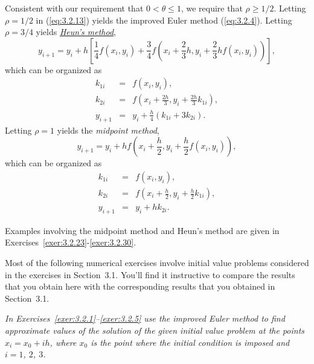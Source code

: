 Consistent with our requirement that $0<\theta\le1$, we require that $\rho\ge1/2$. Letting $\rho=1/2$
in (\ref{eq:3.2.13}) yields the improved Euler method (\ref{eq:3.2.4}). Letting $\rho=3/4$ yields
\href{https://mathshistory.st-andrews.ac.uk/Biographies/Heun/}{\color{blue}
\it Heun's method},
\[
  y_{i+1}=y_{i}+h\left[\frac{1}{4}f(x_{i},y_{i})+\frac{3}{4}f\left( x_{i}+\frac{2}{3}h,y_{i}+\frac{2}{3}hf(x_{i},y_{i})\right)\right],
\]
which can be organized as
\begin{eqnarray*}
  k_{1i}  & = & f(x_{i},y_{i}),                                            \\
  k_{2i}  & = & f\left(x_{i}+\frac{2h}{3},y_{i}+\frac{2h}{3}k_{1i}\right), \\
  y_{i+1} & = & y_{i}+\frac{h}{4}(k_{1i}+3k_{2i}).
\end{eqnarray*}
Letting $\rho=1$ yields the {\color{blue}\it midpoint method\/},
\[
  y_{i+1}=y_{i}+hf\left(x_{i}+\frac{h}{2},y_{i}+\frac{h}{2}f(x_{i},y_{i})\right),
\]
which can be organized as
\begin{eqnarray*}
  k_{1i}  & = & f(x_{i},y_{i}),                                          \\
  k_{2i}  & = & f\left(x_{i}+\frac{h}{2},y_{i}+\frac{h}{2}k_{1i}\right), \\
  y_{i+1} & = & y_{i}+hk_{2i}.
\end{eqnarray*}

Examples involving the midpoint method and Heun's method are given in
Exercises~\ref{exer:3.2.23}-\ref{exer:3.2.30}.

\exercises Most of the following numerical exercises involve initial value problems considered in the exercises in Section~3.1. You'll find it instructive to compare the results that you obtain here with the corresponding results that you obtained in Section~3.1.

\emph{In Exercises~\ref{exer:3.2.1}--\ref{exer:3.2.5} use the improved Euler method to find
approximate values of the solution of the given initial value problem at the points
$x_{i}=x_{0}+ih$, where $x_{0}$ is the point where the initial condition is imposed and $i=1$, $2$,
$3$.}

